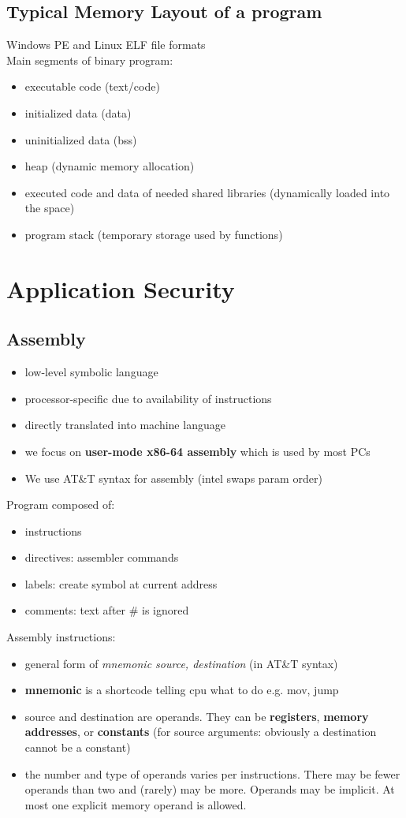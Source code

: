 \documentclass{article}
\begin{document}
\subsection{Typical Memory Layout of a program}
Windows PE and Linux ELF file formats
\\Main segments of binary program:
\begin{itemize}
    \item executable code (text/code)
    \item initialized data (data)
    \item uninitialized data (bss)
    \item heap (dynamic memory allocation)
    \item executed code and data of needed shared libraries (dynamically loaded into the space)
    \item program stack (temporary storage used by functions)
\end{itemize}
\section{Application Security}
\subsection{Assembly}
\begin{itemize}
    \item low-level symbolic language
    \item processor-specific due to availability of instructions
    \item directly translated into machine language
    \item we focus on \textbf{user-mode x86-64 assembly} which is used by most PCs
    \item We use AT\&T syntax for assembly (intel swaps param order)
\end{itemize}
Program composed of:
\begin{itemize}
    \item instructions
    \item directives: assembler commands
    \item labels: create symbol at current address
    \item comments: text after \# is ignored
\end{itemize}
Assembly instructions:
\begin{itemize}
    \item general form of \textit{mnemonic source, destination} (in AT\&T syntax)
    \item \textbf{mnemonic} is a shortcode telling cpu what to do e.g. mov, jump
    \item source and destination are operands. They can be \textbf{registers}, \textbf{memory addresses}, or \textbf{constants} (for source arguments: obviously a destination cannot be a constant)
    \item the number and type of operands varies per instructions. There may be fewer operands than two and (rarely) may be more. Operands may be implicit. At most one explicit memory operand is allowed.
\end{itemize}
\end{document}
